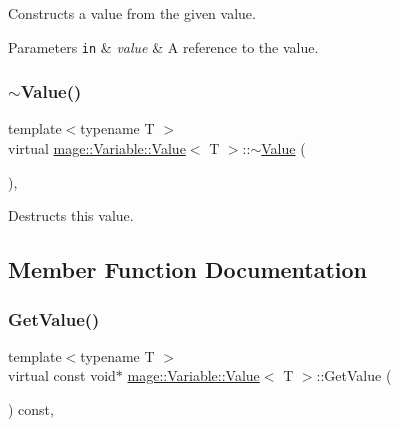 Constructs a value from the given value.


\begin{DoxyParams}[1]{Parameters}
\mbox{\tt in}  & {\em value} & A reference to the value. \\
\hline
\end{DoxyParams}
\hypertarget{structmage_1_1_variable_1_1_value_ab77eb80d4786a060778dc41ee73c1371}{}\label{structmage_1_1_variable_1_1_value_ab77eb80d4786a060778dc41ee73c1371} 
\subsubsection{\texorpdfstring{$\sim$\+Value()}{~Value()}}
{\footnotesize\ttfamily template$<$typename T $>$ \\
virtual \hyperlink{structmage_1_1_variable_1_1_value}{mage\+::\+Variable\+::\+Value}$<$ T $>$\+::$\sim$\hyperlink{structmage_1_1_variable_1_1_value}{Value} (\begin{DoxyParamCaption}{ }\end{DoxyParamCaption})\hspace{0.3cm}{\ttfamily [virtual]}, {\ttfamily [default]}}

Destructs this value. 

\subsection{Member Function Documentation}
\hypertarget{structmage_1_1_variable_1_1_value_a04d70496ebb7ad71dafa3df877daeb26}{}\label{structmage_1_1_variable_1_1_value_a04d70496ebb7ad71dafa3df877daeb26} 
\subsubsection{\texorpdfstring{Get\+Value()}{GetValue()}}
{\footnotesize\ttfamily template$<$typename T $>$ \\
virtual const void$\ast$ \hyperlink{structmage_1_1_variable_1_1_value}{mage\+::\+Variable\+::\+Value}$<$ T $>$\+::Get\+Value (\begin{DoxyParamCaption}{ }\end{DoxyParamCaption}) const\hspace{0.3cm}{\ttfamily [override]}, {\ttfamily [virtual]}}

